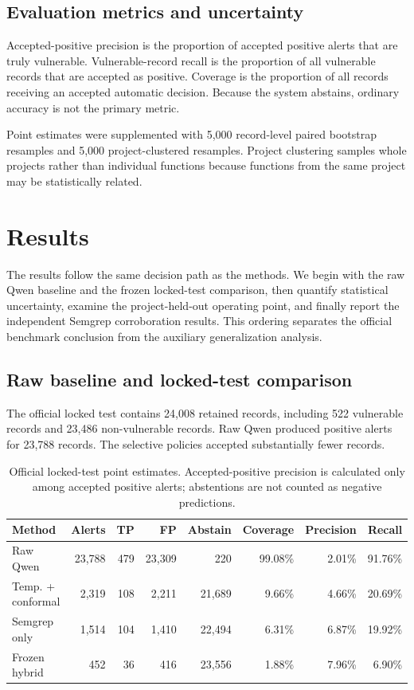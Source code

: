 \documentclass[pdflatex,sn-mathphys-num]{sn-jnl}
\begin{document}
\subsection{Evaluation metrics and uncertainty}

Accepted-positive precision is the proportion of accepted positive alerts that are truly vulnerable. Vulnerable-record recall is the proportion of all vulnerable records that are accepted as positive. Coverage is the proportion of all records receiving an accepted automatic decision. Because the system abstains, ordinary accuracy is not the primary metric.

Point estimates were supplemented with 5,000 record-level paired bootstrap resamples and 5,000 project-clustered resamples. Project clustering samples whole projects rather than individual functions because functions from the same project may be statistically related.

\section{Results}\label{sec:results}

The results follow the same decision path as the methods. We begin with the raw Qwen baseline and the frozen locked-test comparison, then quantify statistical uncertainty, examine the project-held-out operating point, and finally report the independent Semgrep corroboration results. This ordering separates the official benchmark conclusion from the auxiliary generalization analysis.

\subsection{Raw baseline and locked-test comparison}

The official locked test contains 24,008 retained records, including 522 vulnerable records and 23,486 non-vulnerable records. Raw Qwen produced positive alerts for 23,788 records. The selective policies accepted substantially fewer records.

\begin{table}[htbp]
\caption{Official locked-test point estimates. Accepted-positive precision is calculated only among accepted positive alerts; abstentions are not counted as negative predictions.}\label{tab:locked}
\centering
{\small
\begin{tabular}{@{}lrrrrrrr@{}}
\toprule
Method & Alerts & TP & FP & Abstain & Coverage & Precision & Recall\\
\midrule
Raw Qwen & 23,788 & 479 & 23,309 & 220 & 99.08\% & 2.01\% & 91.76\%\\
Temp. + conformal & 2,319 & 108 & 2,211 & 21,689 & 9.66\% & 4.66\% & 20.69\%\\
Semgrep only & 1,514 & 104 & 1,410 & 22,494 & 6.31\% & 6.87\% & 19.92\%\\
Frozen hybrid & 452 & 36 & 416 & 23,556 & 1.88\% & 7.96\% & 6.90\%\\
\bottomrule
\end{tabular}}
\end{table}
\end{document}
